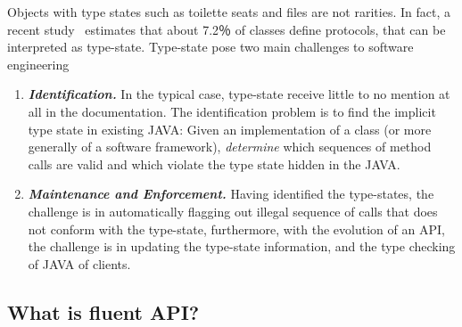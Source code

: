 Objects with type states such as toilette seats and files are not rarities.
In fact, a recent study~\cite{Beckman:2011} estimates
  that about 7.2％ of \Java classes define protocols, that can be interpreted as type-state.
Type-state pose two main challenges to software engineering
\begin{enumerate}
  \item \emph{\textbf{Identification.}}
    In the typical case, type-state
        receive little to no mention at all in the documentation.
    The identification problem is to find the implicit
    type state in existing JAVA: Given an implementation of a class
    (or more generally of a software framework),
    \emph{determine} which sequences of method calls are valid and which violate the
    type state hidden in the JAVA.
  \item \emph{\textbf{Maintenance and Enforcement.}}
    Having identified the type-states, the challenge is in automatically flagging out
      illegal sequence of calls that does not conform
      with the type-state, furthermore, with the
      evolution of an API, the challenge is in updating the type-state information,
      and the type checking of JAVA of clients.
\end{enumerate}

\subsection{What is fluent API?}
